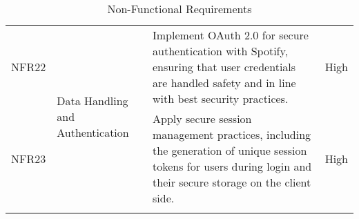\begin{longtable}{ |m{1.5cm}|m{3.5cm}|m{7cm}|m{1.5cm}| }
    \hline
    NFR22 & \multirow{2}{=}{Data Handling and Authentication} & Implement OAuth 2.0 for secure authentication with Spotify, ensuring that user credentials are handled safety and in line with best security practices. & High \\
    \cline{1-1} \cline{3-4}
    NFR23 &  & Apply secure session management practices, including the generation of unique session tokens for users during login and their secure storage on the client side. & High \\
    \hline
    \caption{Non-Functional Requirements} \\
\end{longtable}

